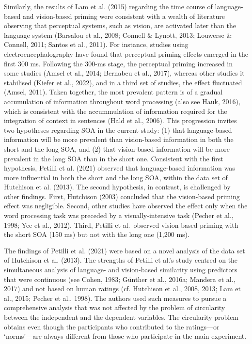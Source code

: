 \documentclass[
  12pt,
  man,floatsintext]{apa7}
\begin{document}
Similarly, the results of Lam et al. (2015) regarding the time course of language-based and vision-based priming were consistent with a wealth of literature observing that perceptual systems, such as vision, are activated later than the language system (Barsalou et al., 2008; Connell \& Lynott, 2013; Louwerse \& Connell, 2011; Santos et al., 2011). For instance, studies using electroencephalography have found that perceptual priming effects emerged in the first 300 ms. Following the 300-ms stage, the perceptual priming increased in some studies (Amsel et al., 2014; Bernabeu et al., 2017), whereas other studies it stabilised (Kiefer et al., 2022), and in a third set of studies, the effect fluctuated (Amsel, 2011). Taken together, the most prevalent pattern is of a gradual accumulation of information throughout word processing (also see Hauk, 2016), which is consistent with the accummulation of information required for the integration of context in sentences (Hald et al., 2006). This progression invites two hypotheses regarding SOA in the current study: (1) that language-based information will be more prevalent than vision-based information in both the short and the long SOA, and (2) that vision-based information will be more prevalent in the long SOA than in the short one. Consistent with the first hypothesis, Petilli et al. (2021) observed that language-based information was more influential in both the short and the long SOA, within the data set of Hutchison et al. (2013). The second hypothesis, in contrast, is challenged by other findings. First, Hutchison (2003) concluded that the vision-based priming effect was negligible. Second, other studies have observed the effect only when the word processing task was preceded by a visually-intensive task (Pecher et al., 1998; Yee et al., 2012). Third, Petilli et al.~observed vision-based priming with the short SOA (150 ms) but not with the long one (1,200 ms).

The findings of Petilli et al. (2021) were based on a novel analysis of the data set of Hutchison et al. (2013). The strengths of Petilli et al.'s study centred on the simultaneous analysis of language- and vision-based similarity using predictors that were continuous (see Cohen, 1983; Günther et al., 2016a; Mandera et al., 2017) and not based on human ratings (cf. Hutchison et al., 2008, 2013; Lam et al., 2015; Pecher et al., 1998). The authors used such measures to pursue a comprehensive analysis that was not affected by the problem of circularity between the independent and the dependent variables. The circularity problem obtains even though the participants who contributed to the ratings---or `norms'---are always different from those who participate in the main experiment.
\end{document}
